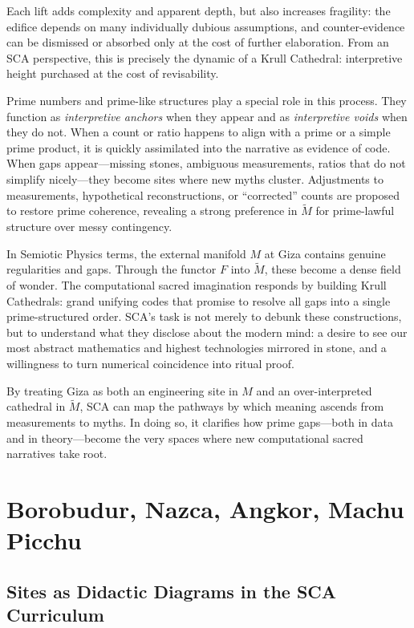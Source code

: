 \documentclass[12]{amsart}
\theoremstyle{plain}
\begin{document}
Each lift adds complexity and apparent depth, but also increases fragility: the edifice depends on many individually dubious assumptions, and counter-evidence can be dismissed or absorbed only at the cost of further elaboration. From an SCA perspective, this is precisely the dynamic of a Krull Cathedral: interpretive height purchased at the cost of revisability.

Prime numbers and prime-like structures play a special role in this process. They function as \emph{interpretive anchors} when they appear and as \emph{interpretive voids} when they do not. When a count or ratio happens to align with a prime or a simple prime product, it is quickly assimilated into the narrative as evidence of code. When gaps appear---missing stones, ambiguous measurements, ratios that do not simplify nicely---they become sites where new myths cluster. Adjustments to measurements, hypothetical reconstructions, or ``corrected'' counts are proposed to restore prime coherence, revealing a strong preference in $\tilde M$ for prime-lawful structure over messy contingency.

In Semiotic Physics terms, the external manifold $M$ at Giza contains genuine regularities and gaps. Through the functor $F$ into $\tilde M$, these become a dense field of wonder. The computational sacred imagination responds by building Krull Cathedrals: grand unifying codes that promise to resolve all gaps into a single prime-structured order. SCA's task is not merely to debunk these constructions, but to understand what they disclose about the modern mind: a desire to see our most abstract mathematics and highest technologies mirrored in stone, and a willingness to turn numerical coincidence into ritual proof.

By treating Giza as both an engineering site in $M$ and an over-interpreted cathedral in $\tilde M$, SCA can map the pathways by which meaning ascends from measurements to myths. In doing so, it clarifies how prime gaps---both in data and in theory---become the very spaces where new computational sacred narratives take root.

\section{Borobudur, Nazca, Angkor, Machu Picchu}

\subsection{Sites as Didactic Diagrams in the SCA Curriculum}
\end{document}
